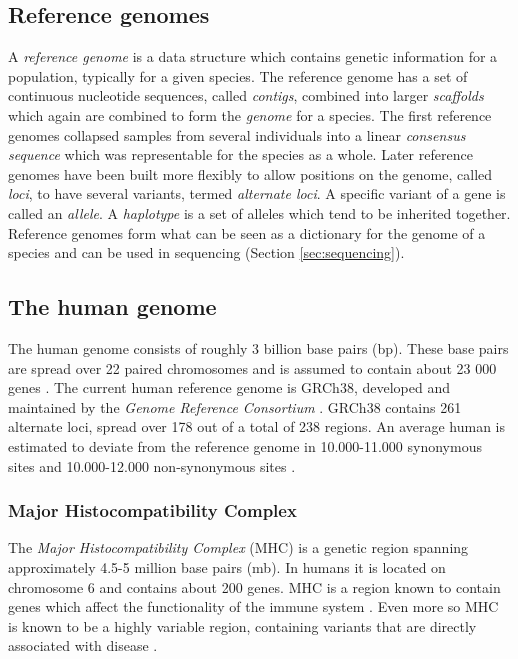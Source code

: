 \documentclass[thesis.tex]{subfiles}
\begin{document}
\subsection{Reference genomes}
A \textit{reference genome} is a data structure which contains genetic information for a population, typically for a given species. The reference genome has a set of continuous nucleotide sequences, called \textit{contigs}, combined into larger \textit{scaffolds} which again are combined to form the \textit{genome} for a species. The first reference genomes collapsed samples from several individuals into a linear \textit{consensus sequence} which was representable for the species as a whole. Later reference genomes have been built more flexibly to allow positions on the genome, called \textit{loci}, to have several variants, termed \textit{alternate loci}. A specific variant of a gene is called an \textit{allele}. A \textit{haplotype} is a set of alleles which tend to be inherited together. Reference genomes form what can be seen as a dictionary for the genome of a species and can be used in sequencing (Section \ref{sec:sequencing}).
\subsection{The human genome}
The human genome consists of roughly 3 billion base pairs (bp). These base pairs are spread over 22 paired chromosomes and is assumed to contain about 23 000 genes \cite{introduction_to_genomics}. The current human reference genome is GRCh38\cite{grch38}, developed and maintained by the \textit{Genome Reference Consortium} \cite{genome_reference_consortium}. GRCh38 contains 261 alternate loci, spread over 178 out of a total of 238 regions. An average human is estimated to deviate from the reference genome in 10.000-11.000 synonymous sites and 10.000-12.000 non-synonymous sites \cite{a_map_of_human_genome_variation_from_population_scale_sequencing}.
\subsubsection{Major Histocompatibility Complex}
\label{sec:mhc}
The \textit{Major Histocompatibility Complex} (MHC) is a genetic region spanning approximately 4.5-5 million base pairs (mb)\cite{improved_genome_inference_in_the_mhc_using_a_population_reference_graph}\cite{canonical_stable_general_mapping_using_context_schemes}. In humans it is located on chromosome 6 and contains about 200 genes. MHC is a region known to contain genes which affect the functionality of the immune system \cite{the_importance_of_immune_gene_variability_in_evolutionary_ecology_and_conservation}. Even more so MHC is known to be a highly variable region, containing variants that are directly associated with disease \cite{variation_analysis_and_gene_annotation_of_eight_mhc_haplotypes}.
\end{document}
